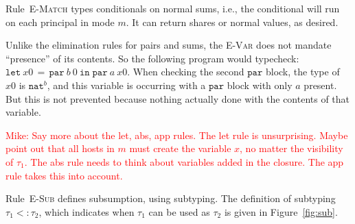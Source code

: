 \documentclass[10pt]{article}
\newcommand{\rulelab}[1]{{\small \textsc{#1}}}
\newcommand{\kw}[1]{\ensuremath{\mathtt{#1}}}
\newcommand{\tnat}{\ensuremath{\mathtt{nat}}}
\newcommand{\isec}{\ensuremath{\mathtt{pmap}}}
\newcommand{\sectyp}[3]{\ensuremath{{#1} \{~{#2}:{#3}~\}}}
\newcommand{\elet}[3]{\ensuremath{\kw{let}~#1\, =\, #2~\kw{in}\;{#3}}}
\newcommand{\epar}[2]{\ensuremath{\kw{par}~{#1}~{#2}}}
\newcommand{\econd}[3]{\ensuremath{\kw{match}~{#1}~\kw{with}~{#2} \mid {#3}}}
\newcommand{\subtype}{\ensuremath{<:}}
\newcommand{\issub}[2]{{#1} \subtype {#2}}
\newcommand{\mwh}[1]{\textcolor{red}{Mike: #1}}
\begin{document}
Rule~\rulelab{E-Match} types conditionals on normal sums, i.e., the
conditional will run on each principal in mode $m$. It can return
shares or normal values, as desired. 

Unlike the elimination rules for pairs and sums, the \rulelab{E-Var}
does not mandate ``presence'' of its contents. So the following
program would typecheck: $\elet{x0}{\epar{b}0}{\epar{a}{x0}}$. When
checking the second $\kw{par}$ block, the type of $x0$ is $\tnat^{b}$,
and this variable is occurring with a $\kw{par}$ block with only $a$
present. But this is not prevented because nothing actually done with
the contents of that variable.

\mwh{Say more about the let, abs, app rules. The let rule is
  unsurprising. Maybe point out that all hosts in $m$ must create the
  variable $x$, no matter the visibility of $\tau_1$. The abs rule
  needs to think about variables added in the closure. The app rule
  takes this into account.}

Rule~\rulelab{E-Sub} defines subsumption, using subtyping.  The
definition of subtyping $\issub{\tau_1}{\tau_2}$, which indicates when
$\tau_1$ can be used as $\tau_2$ is given in Figure~\ref{fig:sub}.

\end{document}

